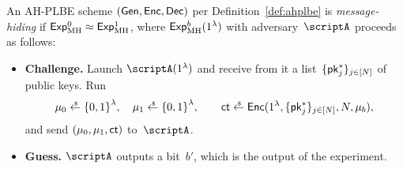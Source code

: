 \begin{definition}\label{def:ahplbe-message-hiding}
An AH-PLBE scheme $(\Gen,\Enc,\Dec)$ per Definition~\ref{def:ahplbe}
is \emph{message-hiding} if ${\ExpMH{0}\approx\ExpMH{1}}$,
where $\ExpMH{b}(1^\lambda)$ with adversary~$\scriptA$ proceeds as follows:
\begin{itemize}\upshape
\item\textbf{Challenge.}
Launch $\scriptA(1^\lambda)$ and
receive from it a list~$\{\pk^\ast_j\}_{j\in[N]}$ of public keys.
Run
\begin{align*}
\mu_0\draws\bit^\lambda,\quad
\mu_1\draws\bit^\lambda,\qquad
\ct\draws\Enc(1^\lambda,\{\pk^\ast_j\}_{j\in[N]},N,\mu_b),
\end{align*}
and send $(\mu_0,\mu_1,\ct)$ to~$\scriptA$.
\item\textbf{Guess.}
$\scriptA$ outputs a bit~$b'$, which is the output of the experiment.
\end{itemize}
\end{definition}
